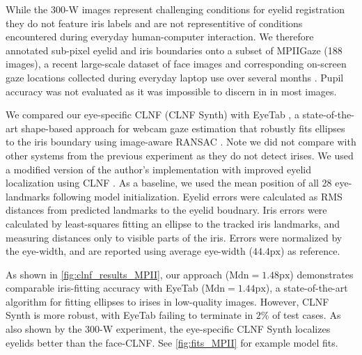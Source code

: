 While the 300-W images represent challenging conditions for eyelid registration they do not feature iris labels and are not representitive of conditions encountered during everyday human-computer interaction.
We therefore annotated sub-pixel eyelid and iris boundaries onto a subset of MPIIGaze \citet{zhang15_cvpr} (188 images), a recent large-scale dataset of face images and corresponding on-screen gaze locations collected during everyday laptop use over several months \cite{zhang15_cvpr}.
Pupil accuracy was not evaluated as it was impossible to discern in in most images.

We compared our eye-specific CLNF (CLNF Synth) with EyeTab \cite{wood2014eyetab}, a state-of-the-art shape-based approach for webcam gaze estimation that robustly fits ellipses to the iris boundary using image-aware RANSAC \cite{swirski2012robust}. Note we did not compare with other systems from the previous experiment as they do not detect irises.
We used a modified version of the author's implementation with improved eyelid localization using CLNF \cite{baltrusaitis2013constrained}.
As a baseline, we used the mean position of all 28 eye-landmarks following model initialization.
Eyelid errors were calculated as RMS distances from predicted landmarks to the eyelid boudnary.
Iris errors were calculated by least-squares fitting an ellipse to the tracked iris landmarks, and measuring distances only to visible parts of the iris.
Errors were normalized by the eye-width, and are reported using average eye-width ($44.4\textrm{px}$) as reference.

As shown in \autoref{fig:clnf_results_MPII}, our approach ($\textrm{Mdn}\!=\!1.48\textrm{px}$) demonstrates comparable iris-fitting accuracy with EyeTab ($\textrm{Mdn}\!=\!1.44\textrm{px}$), a state-of-the-art algorithm for fitting ellipses to irises in low-quality images.
However, CLNF Synth is more robust, with EyeTab failing to terminate in $2\%$ of test cases.
As also shown by the 300-W experiment, the eye-specific CLNF Synth localizes eyelids better than the face-CLNF.
See \autoref{fig:fits_MPII} for example model fits.

